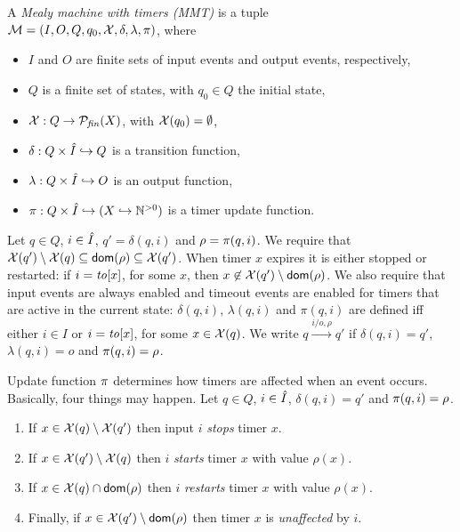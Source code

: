 \begin{definition}
\label{def:MMT}
A \emph{Mealy machine with timers (MMT)} is a tuple
\\
${\cal M} = (I, O, Q, q_0, \mathcal{X}, \delta, \lambda, \pi)$, where
\begin{itemize}
\item
$I$ and $O$ are finite sets of input events and output events, respectively,
\item
$Q$ is a finite set of states,
with
$q_0 \in Q$ the initial state,
\item
$\mathcal{X}: Q \rightarrow {\cal{P}}_{\mathit{fin}}(X)$, with $\mathcal{X}(q_0) = \emptyset$,
\item
$\delta: Q \times \hat{I} \hookrightarrow  Q$ is a transition function,
\item
$\lambda: Q \times \hat{I} \hookrightarrow O$ is an output function, 
\item
$\pi : Q \times \hat{I} \hookrightarrow (X \hookrightarrow {\mathbb N}^{>0})$ is a timer update function.
\end{itemize}
Let $q \in Q$, $i \in \hat{I}$, $q'=\delta(q,i)$ and $\rho=\pi(q,i)$. 
We require that $\mathcal{X}(q') \setminus \mathcal{X}(q) \subseteq {\textsf{dom}}(\rho) \subseteq\mathcal{X}(q')$. 
When timer $x$ expires it is either stopped or restarted:
if $i=\mathit{to}[x]$, for some $x$, then $x \not\in \mathcal{X}(q') \setminus {\textsf{dom}}(\rho)$.
%
We also require that input events are always enabled and timeout events are enabled
for timers that are active in the current state:
$\delta(q,i)$, $\lambda(q,i)$ and $\pi(q,i)$ are defined iff either
$i \in I$ or $i=\mathit{to}[x]$, for some $x \in\mathcal{X}(q)$.
We write $q \xrightarrow{i/o,\rho} q'$ if $\delta(q,i) = q'$, $\lambda(q,i)= o$ and $\pi(q,i) = \rho$.
\end{definition}
Update function $\pi$ determines how timers are affected when an event occurs.
Basically, four things may happen.
Let $q \in Q$, $i \in \hat{I}$, $\delta(q,i)=q'$ and $\pi(q,i)=\rho$.
\begin{enumerate}
\item
If $x \in\mathcal{X}(q) \setminus \mathcal{X}(q')$ then input $i$ \emph{stops} timer $x$.
\item
If $x \in \mathcal{X}(q') \setminus \mathcal{X}(q)$ then $i$ \emph{starts} timer $x$ with value $\rho(x)$.
\item
If $x \in \mathcal{X}(q) \cap {\textsf{dom}}(\rho)$ then $i$ \emph{restarts} timer $x$ with value $\rho(x)$.
\item
Finally, if $x \in \mathcal{X}(q') \setminus {\textsf{dom}}(\rho)$ then timer $x$ is \emph{unaffected} by $i$.
\end{enumerate}

